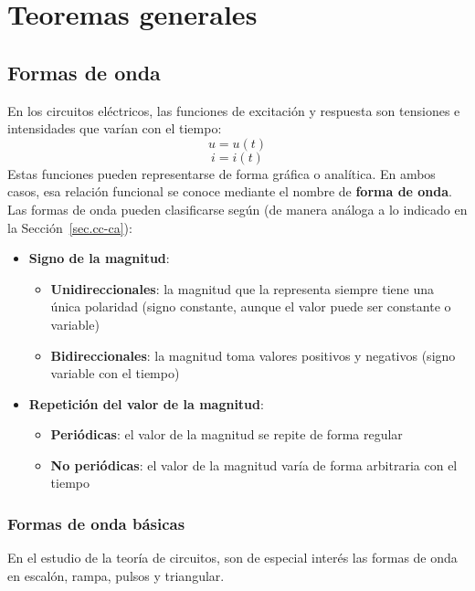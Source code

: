 \chapter{Teoremas generales}\label{chap:teoremas}

\section{Formas de onda}
	
En los circuitos eléctricos, las funciones de excitación y respuesta
son tensiones e intensidades que varían con el tiempo:
\begin{equation*}
  u=u(t)
\end{equation*}
\begin{equation*}
  i=i(t)
\end{equation*}
Estas funciones pueden representarse de forma gráfica o analítica. En
ambos casos, esa relación funcional se conoce mediante el nombre de
\textbf{forma de onda}. Las formas de onda pueden clasificarse según
(de manera análoga a lo indicado en la Sección~\ref{sec.cc-ca}):
\begin{itemize}
\item \textbf{Signo de la magnitud}:
  \begin{itemize}
  \item \textbf{Unidireccionales}: la magnitud que la representa
    siempre tiene una única polaridad (signo constante, aunque el
    valor puede ser constante o variable)
  \item \textbf{Bidireccionales}: la magnitud toma valores positivos y
    negativos (signo variable con el tiempo)
  \end{itemize}
\item \textbf{Repetición del valor de la magnitud}:
  \begin{itemize}
  \item \textbf{Periódicas}: el valor de la magnitud se repite de
    forma regular
  \item \textbf{No periódicas}: el valor de la magnitud varía de forma
    arbitraria con el tiempo
  \end{itemize}
\end{itemize}

\subsection{Formas de onda básicas}
En el estudio de la teoría de circuitos, son de especial interés las
formas de onda en escalón, rampa, pulsos y triangular.
	
